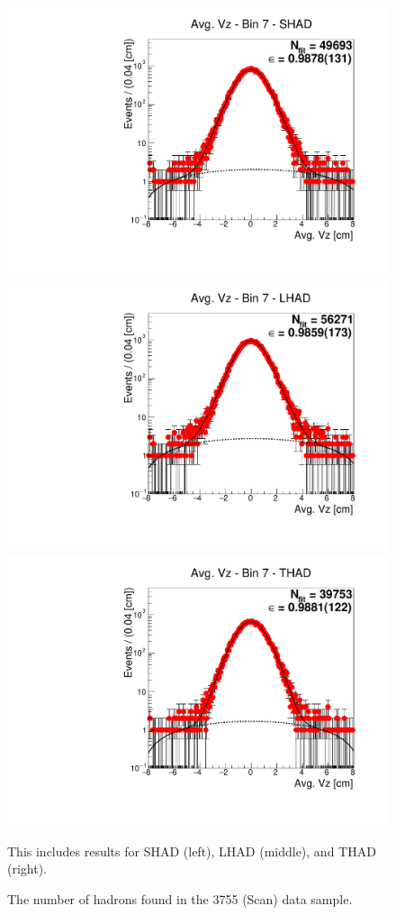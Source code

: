 \begin{figure}[H]
\centering
\includegraphics[scale=0.25]{figures/plots/nonDDbar_fit_results/scan/fit_scan_07_data_SHAD.pdf}
\hspace{-0.5cm}
\includegraphics[scale=0.25]{figures/plots/nonDDbar_fit_results/scan/fit_scan_07_data_LHAD.pdf}
\hspace{-0.5cm}
\includegraphics[scale=0.25]{figures/plots/nonDDbar_fit_results/scan/fit_scan_07_data_THAD.pdf}
\caption{The number of hadrons found in the 3755 (Scan) data sample.}
{This includes results for SHAD (left), LHAD (middle), and THAD (right).}
\label{fig:hadron_fits_scan_07}
\end{figure}

